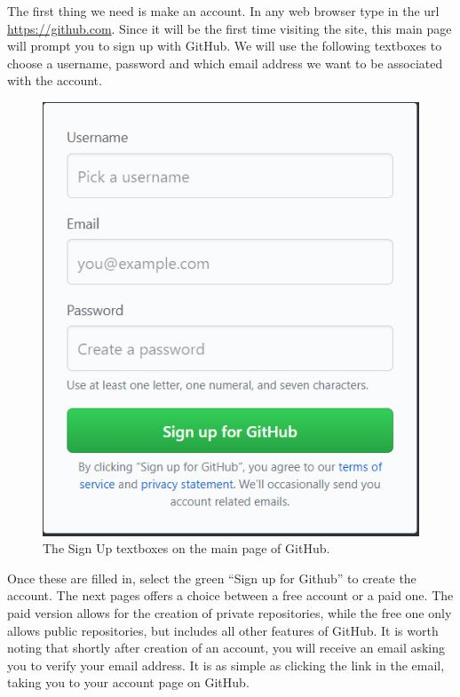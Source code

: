 \documentclass[11pt]{article}
\begin{document}
The first thing we need is make an account. In any web browser type in the url \url{https://github.com}. Since it will be the first time visiting the site, this main page will prompt you to sign up with GitHub. We will use the following textboxes to choose a username, password and which email address we want to be associated with the account.

\begin{figure}[h!]
\begin{center}
\includegraphics[scale=.5]{GithubSignup.png} 
\caption{The Sign Up textboxes on the main page of GitHub.}
\end{center}
\end{figure} 

Once these are filled in, select the green ``Sign up for Github'' to create the account. The next pages offers a choice between a free account or a paid one. The paid version allows for the creation of private repositories, while the free one only allows public repositories, but includes all other features of GitHub. It is worth noting that shortly after creation of an account, you will receive an email asking you to verify your email address. It is as simple as clicking the link in the email, taking you to your account page on GitHub.
\end{document}
